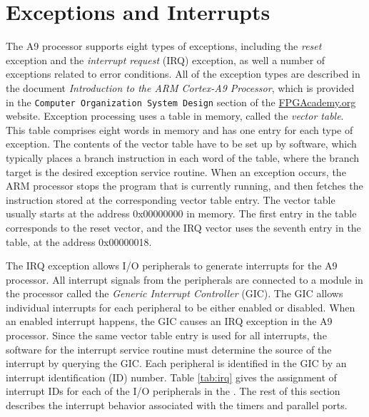 \section{Exceptions and Interrupts}
\label{sec:exceptions}

The A9 processor supports eight types of exceptions, including the {\it reset} exception and the
{\it interrupt request} (IRQ) exception, as well a number of exceptions related to 
error conditions. All of the exception types are described in the document 
{\it Introduction to the ARM Cortex-A9 Processor}, which is provided in 
the \texttt{Computer Organization System Design} section of the 
\href{https://www.fpgacademy.org/tutorials.html} {FPGAcademy.org} website.
Exception processing uses a table in memory, called the {\it vector table}. This 
table comprises eight words in memory and has one entry for each type of exception. The 
contents of the vector table have to be set up by software, which typically places a 
branch instruction in each word of the table, where the branch target is the desired 
exception service routine. When an exception occurs, the ARM processor stops the 
program that is currently running, and then fetches the instruction 
stored at the corresponding vector table entry.  The vector table usually starts at 
the address {\sf 0x00000000} in memory. The first entry in the table corresponds to the 
reset vector, and the IRQ vector uses the seventh entry in the table, at the 
address {\sf 0x00000018}.

The IRQ exception allows I/O peripherals to generate interrupts for the A9 processor.
All interrupt signals from the peripherals are connected to a module in the processor
called the {\it Generic Interrupt Controller} (GIC). The GIC allows individual interrupts
for each peripheral to be either enabled or disabled. When an enabled interrupt happens, the 
GIC causes an IRQ exception in the A9 processor. Since the same vector table entry is used for 
all interrupts, the software for the interrupt service routine must determine the source 
of the interrupt by querying the GIC. Each peripheral is identified in the GIC by an
interrupt identification (ID) number.  Table \ref{tab:irq}
gives the assignment of interrupt IDs for each of the I/O peripherals in the \systemName.
The rest of this section describes the interrupt behavior associated with the 
timers and parallel ports.

